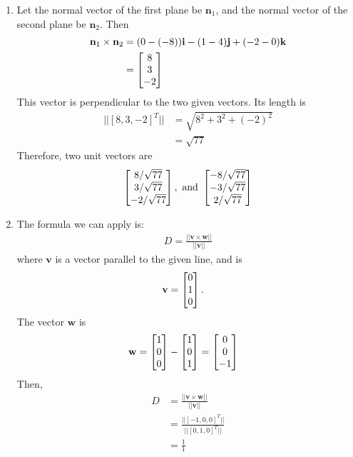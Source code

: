 \documentclass{article}
\begin{document}
\begin{enumerate}
\item
Let the normal vector of the first plane be $\mathbf{n}_1$, and the normal vector of the second plane be $\mathbf{n}_2$. Then  
\begin{align*}
\mathbf{n}_1 \times \mathbf{n}_2 
&= (0-(-8))\mathbf{i} - (1-4)\mathbf{j}+(-2-0)\mathbf{k} \\
&=\begin{bmatrix} 8 \\ 3 \\ -2 \end{bmatrix}
\end{align*}
This vector is perpendicular to the two given vectors. Its length is
\begin{align*}
\big|\big| [8,3,-2]^T \big|\big| 
&= \sqrt{ 8^2+3^2+(-2)^2} \\
&= \sqrt{77}
\end{align*}
Therefore, two unit vectors are
\begin{align*}
\begin{bmatrix} 8/\sqrt{77} \\ 3/\sqrt{77}\\ -2/\sqrt{77}\end{bmatrix} , \text{ and } \begin{bmatrix} -8/\sqrt{77} \\ -3/\sqrt{77} \\ 2/\sqrt{77} \end{bmatrix}
\end{align*}
\item
The formula we can apply is:
\begin{align*}
  D = \frac{||\mathbf{v} \times \mathbf{w}||}{|| \mathbf{v}||}
\end{align*}
where $\mathbf{v}$ is a vector parallel to the given line, and is
\begin{align*}
  \mathbf{v} &= \begin{bmatrix} 0 \\ 1 \\ 0 \end{bmatrix}.
\end{align*}
The vector $\mathbf{w}$ is
\begin{align*}
  \mathbf{w} &= \begin{bmatrix} 1 \\ 0 \\ 0 \end{bmatrix}  - \begin{bmatrix} 1 \\ 0 \\ 1 \end{bmatrix} = \begin{bmatrix} 0\\0\\-1 \end{bmatrix}
\end{align*}
Then,
\begin{align*}
  D & = \frac{||\mathbf{v} \times \mathbf{w}||}{|| \mathbf{v}||} \\
  &= \frac{||[ -1,0,0 ] ^T||}{|| [0,1,0]^T||}\\
  &= \frac{1}{1}\\

\end{align*}
\end{enumerate}
\end{document}
